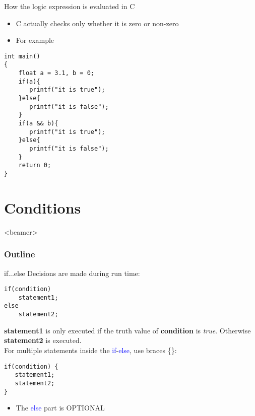 \begin{frame}[fragile]{How the logic expression is evaluated in C}
\vspace{-0.1in}
\begin{itemize}
	\item {C actually checks only whether it is zero or non-zero}
	\item {For example}
\end{itemize}
\begin{lstlisting}
int main()
{   
    float a = 3.1, b = 0;
    if(a){
       printf("it is true");
    }else{
       printf("it is false");
    }
    if(a && b){
       printf("it is true");
    }else{
       printf("it is false");
    }
    return 0;
}
\end{lstlisting}
\end{frame}

\section{Conditions}
\begin{frame}<beamer>
    \frametitle{Outline}
    \tableofcontents[currentsection]
\end{frame}

\begin{frame}[fragile]{if...else}
	Decisions are made during run time:
	\begin{lstlisting}[numbers=none, basicstyle=\footnotesize]
if(condition)
    statement1;
else
    statement2;
\end{lstlisting}
	\textbf{statement1} is only executed if the truth value of \textbf{condition} is \textit{true}. Otherwise \textbf{statement2} is executed.  \\
	For multiple statements inside the \textcolor{blue}{if}-\textcolor{blue}{else}, use braces \{\}:
	\begin{lstlisting}[numbers=none, basicstyle=\footnotesize]
if(condition) {
   statement1;
   statement2;
}
\end{lstlisting}
\begin{itemize}
	\item {The \textcolor{blue}{else} part is OPTIONAL}
\end{itemize}
\end{frame}



